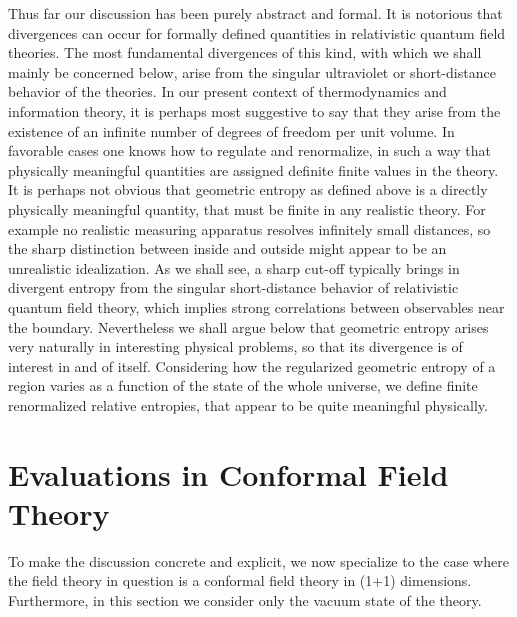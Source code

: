 Thus far our discussion has been purely abstract and formal.  It is
notorious that divergences can occur for formally defined
quantities
in relativistic quantum field theories.  The most fundamental
divergences of this kind, with which we shall mainly be concerned below,
arise from the singular
ultraviolet or short-distance behavior of the theories.
In our present context of thermodynamics and information theory, it is
perhaps most suggestive to say that they arise from the existence of
an infinite number of degrees of freedom per unit volume.
In favorable cases one knows
how to regulate and renormalize, in such a way that
physically meaningful quantities
are assigned definite finite values in the theory.  It is perhaps not
obvious that geometric entropy as defined above is a directly physically
meaningful quantity, that must be finite in any realistic
theory.  For example
no realistic measuring apparatus resolves infinitely
small distances, so the sharp distinction between inside and outside
might appear to be an unrealistic
idealization.  As we shall see, a sharp cut-off typically
brings in divergent entropy
from the singular short-distance behavior of
relativistic quantum field theory, which
implies strong correlations between observables
near the boundary.
Nevertheless we shall argue below that geometric entropy arises very
naturally in interesting physical problems, so that its divergence is
of interest in and of itself.
Considering how the regularized geometric entropy of a region
varies as a function of the state of the whole universe, we define finite
renormalized
relative entropies, that appear to be quite meaningful physically.

\section{Evaluations in Conformal Field Theory}

To make the discussion concrete and explicit,
we now specialize to the case where the field theory
in question is a conformal field theory in (1+1) dimensions. Furthermore,
in this section
we consider only the vacuum state of the theory.

